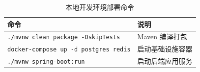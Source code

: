 {    \begin{table}[htbp]
      \centering
      \caption{本地开发环境部署命令}
      \label{tab:deploy-local}
      \begin{tabular}{p{9cm}p{3.5cm}}
        \hline
        命令 & 说明 \\
        \hline
        \texttt{./mvnw clean package -DskipTests} & Maven 编译打包 \\
        \texttt{docker-compose up -d postgres redis} & 启动基础设施容器 \\
        \texttt{./mvnw spring-boot:run} & 启动后端应用服务 \\
        \hline
      \end{tabular}
    \end{table}

    \removeappendixsubsecmajornumbering
}

